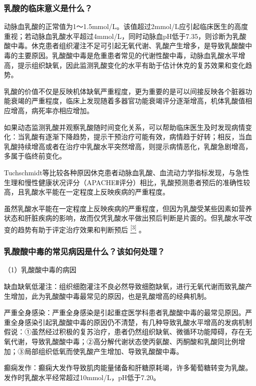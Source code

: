 \subsubsection{乳酸的临床意义是什么？}

动脉血乳酸的正常值为1～1.5mmol/L。该值超过2mmol/L应引起临床医生的高度重视；若动脉血乳酸水平超过4mmol/L，同时动脉血pH低于7.35，则诊断为乳酸酸中毒。休克患者组织灌注不足可引起无氧代谢、乳酸产生增多，是导致乳酸酸中毒的主要原因。乳酸酸中毒是危重患者常见的代谢性酸中毒，动脉血乳酸水平增高，提示组织缺氧，因此监测乳酸变化的水平有助于估计休克的复苏效果和变化趋势。

乳酸的价值不仅是反映机体缺氧严重程度，更为重要的是可以间接反映各个脏器功能衰竭的严重程度，临床上发现随着多器官功能衰竭评分逐渐增高，机体乳酸值相应增高，病死率亦相应增加。

如果动态监测乳酸并观察乳酸随时间变化关系，可以帮助临床医生及时发现病情变化：当乳酸有逐渐下降趋势，提示干预治疗可能有效，病情趋于好转；相反，当血乳酸持续增高或者在治疗中乳酸水平突然增高，则提示病情恶化，乳酸急剧增高，多属于临终前变化。

Tuchschmidt等比较各种原因休克患者动脉血乳酸、血流动力学指标发现，与急性生理和慢性健康状况评分（APACHEⅡ评分）相比，乳酸预测患者预后的准确性较高，且乳酸水平能在一定程度上反映疾病的严重程度。

虽然乳酸水平能在一定程度上反映疾病的严重程度，但因为乳酸受某些因素如营养状态和肝脏疾病的影响，故而仅凭乳酸水平做出预后判断是片面的。但乳酸水平改变的趋势有助于评定治疗效果和判断预后
\protect\hyperlink{text00026.htmlux5cux23ch3-25}{\textsuperscript{{[}3{]}}}
。

\subsubsection{乳酸酸中毒的常见病因是什么？该如何处理？}

（1）乳酸酸中毒的病因

缺血缺氧低灌注：组织细胞灌注不良必然导致细胞缺氧，进行无氧代谢而致乳酸产生增加，此为乳酸酸中毒最常见的原因，也是乳酸增高的经典机制。

严重全身感染：严重全身感染是引起重症医学科患者乳酸酸中毒的最常见原因。严重全身感染引起乳酸酸中毒的原因仍不清楚，有几种导致乳酸水平增高的发病机制假说：①虽然经过积极的复苏治疗，患者仍然组织缺氧、微循环功能障碍，存在无氧代谢，导致乳酸酸中毒；②高分解代谢状态使丙氨酸、丙酮酸和乳酸同比例增加；③局部组织低氧而使乳酸产生增加、导致乳酸酸中毒。

癫痫发作：癫痫大发作导致肌肉能量储备和肝糖原耗竭，许多葡萄糖转变为乳酸。发作时乳酸水平经常超过10mmol/L，pH低于7.20。

